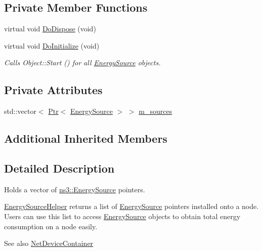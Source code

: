 \subsection*{Private Member Functions}
\begin{DoxyCompactItemize}
\item 
virtual void \hyperlink{classns3_1_1EnergySourceContainer_aecf424a2304c6c1413728a7719c20620}{Do\+Dispose} (void)
\item 
virtual void \hyperlink{classns3_1_1EnergySourceContainer_a88af23c27e4ea05603962559f6e047cf}{Do\+Initialize} (void)
\begin{DoxyCompactList}\small\item\em Calls Object\+::\+Start () for all \hyperlink{classns3_1_1EnergySource}{Energy\+Source} objects. \end{DoxyCompactList}\end{DoxyCompactItemize}
\subsection*{Private Attributes}
\begin{DoxyCompactItemize}
\item 
std\+::vector$<$ \hyperlink{classns3_1_1Ptr}{Ptr}$<$ \hyperlink{classns3_1_1EnergySource}{Energy\+Source} $>$ $>$ \hyperlink{classns3_1_1EnergySourceContainer_a83aaf672f6a5096463c819b0d8b3d98d}{m\+\_\+sources}
\end{DoxyCompactItemize}
\subsection*{Additional Inherited Members}


\subsection{Detailed Description}
Holds a vector of \hyperlink{classns3_1_1EnergySource}{ns3\+::\+Energy\+Source} pointers. 

\hyperlink{classns3_1_1EnergySourceHelper}{Energy\+Source\+Helper} returns a list of \hyperlink{classns3_1_1EnergySource}{Energy\+Source} pointers installed onto a node. Users can use this list to access \hyperlink{classns3_1_1EnergySource}{Energy\+Source} objects to obtain total energy consumption on a node easily.

\begin{DoxySeeAlso}{See also}
\hyperlink{classns3_1_1NetDeviceContainer}{Net\+Device\+Container} 
\end{DoxySeeAlso}


